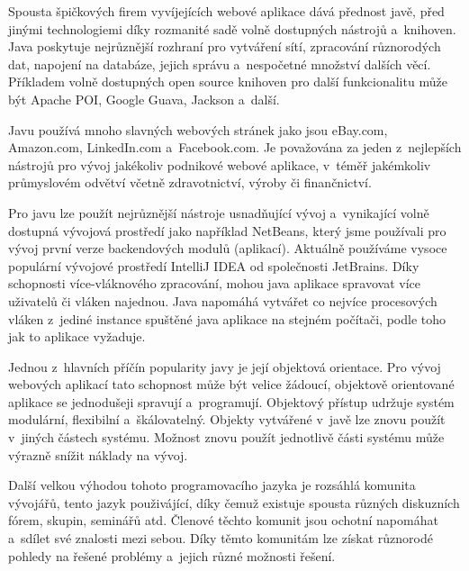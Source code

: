 \documentclass[12pt]{article}
\begin{document}
{%
Spousta špičkových firem vyvíjejících webové aplikace dává přednost javě, 
před jinými technologiemi díky rozmanité sadě volně dostupných nástrojů a~knihoven.
Java poskytuje nejrůznější rozhraní pro vytváření sítí, zpracování různorodých dat,
napojení na databáze, jejich správu a~nespočetné množství dalších věcí.
Příkladem volně dostupných open source knihoven pro další funkcionalitu může být
Apache POI, Google Guava, Jackson a~další.

Javu používá mnoho slavných webových stránek jako jsou
eBay.com, Amazon.com, LinkedIn.com a~Facebook.com. 
Je považována za jeden z~nejlepších nástrojů
pro vývoj jakékoliv podnikové webové aplikace, v~téměř
jakémkoliv průmyslovém odvětví včetně zdravotnictví, výroby či finančnictví.

Pro javu lze použít nejrůznější nástroje usnadňující vývoj a~vynikající volně dostupná vývojová prostředí
jako například NetBeans, který jsme používali pro vývoj první verze backendových modulů 
(aplikací).
Aktuálně používáme vysoce populární vývojové prostředí IntelliJ IDEA
od společnosti JetBrains.
Díky schopnosti více-vláknového zpracování,
mohou java aplikace spravovat více uživatelů či vláken najednou.
Java napomáhá vytvářet co nejvíce procesových vláken z~jediné instance
spuštěné java aplikace na stejném počítači, podle toho jak to aplikace vyžaduje.


Jednou z~hlavních příčín popularity javy je její objektová orientace.
Pro vývoj webových aplikací tato schopnost může být velice žádoucí,
objektově orientované aplikace se jednodušeji spravují a~programují.
Objektový přístup udržuje systém modulární, flexibilní a~škálovatelný.
Objekty vytvářené v~javě lze znovu použít v~jiných částech systému.
Možnost znovu použít jednotlivě části systému může výrazně snížit náklady na vývoj.

Další velkou výhodou tohoto programovacího jazyka je rozsáhlá komunita vývojářů,
tento jazyk použivájící, díky čemuž existuje spousta různých diskuzních fórem,
skupin, seminářů atd. Členové těchto komunit
jsou ochotní napomáhat a~sdílet své znalosti mezi sebou.
Díky těmto komunitám lze získat různorodé pohledy na řešené problémy
a~jejich různé možnosti řešení.


}
\end{document}
